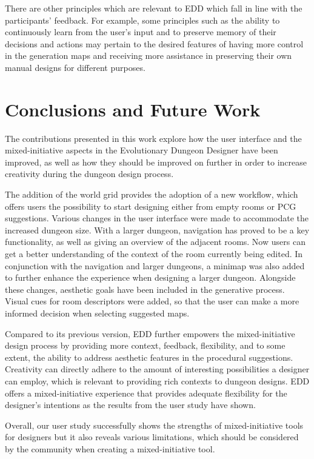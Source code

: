 \documentclass[sigconf]{acmart}
\begin{document}
There are other principles which are relevant to EDD which fall in line with the participants’ feedback. For example, some principles such as the ability to continuously learn from the user’s input and to preserve memory of their decisions and actions may pertain to the desired features of having more control in the generation maps and receiving more assistance in preserving their own manual designs for different purposes.

\section{Conclusions and Future Work}

The contributions presented in this work explore how the user interface and the mixed-initiative aspects in the Evolutionary Dungeon Designer have been improved, as well as how they should be improved on further in order to increase creativity during the dungeon design process.

The addition of the world grid provides the adoption of a new workflow, which offers users the possibility to start designing either from empty rooms or PCG suggestions. Various changes in the user interface were made to accommodate the increased dungeon size. With a larger dungeon, navigation has proved to be a key functionality, as well as giving an overview of the adjacent rooms. Now users can get a better understanding of the context of the room currently being edited. In conjunction with the navigation and larger dungeons, a minimap was also added to further enhance the experience when designing a larger dungeon. Alongside these changes, aesthetic goals have been included in the generative process. Visual cues for room descriptors were added, so that the user can make a more informed decision when selecting suggested maps.

Compared to its previous version, EDD further empowers the mixed-initiative design process by providing more context, feedback, flexibility, and to some extent, the ability to address aesthetic features in the procedural suggestions. Creativity can directly adhere to the amount of interesting possibilities a designer can employ, which is relevant to providing rich contexts to dungeon designs. EDD offers a mixed-initiative experience that provides adequate flexibility for the designer’s intentions as the results from the user study have shown.

Overall, our user study successfully shows the strengths of mixed-initiative tools for designers but it also reveals various limitations, which should be considered by the community when creating a mixed-initiative tool.
\end{document}
